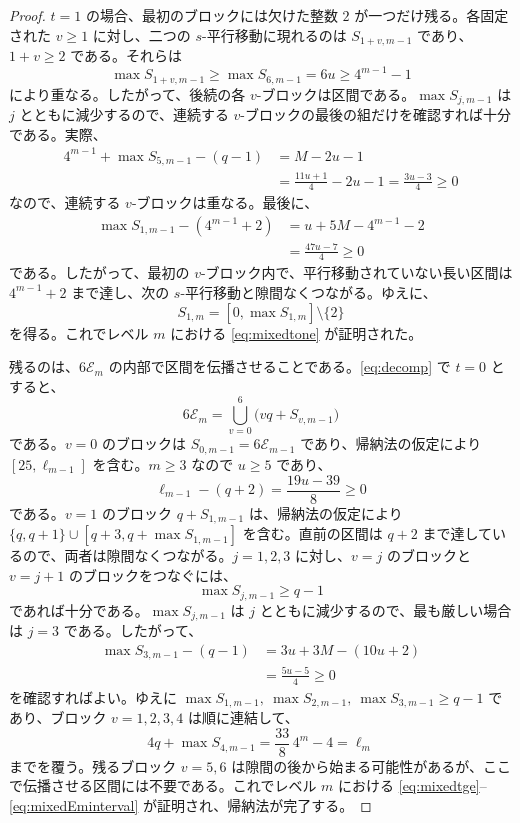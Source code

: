 \documentclass[12pt]{ltjsarticle}
\theoremstyle{plain}
\theoremstyle{definition}
\theoremstyle{plain}
\begin{document}
\begin{proof}
$t=1$ の場合、最初のブロックには欠けた整数 $2$ が一つだけ残る。各固定された $v\geq1$ に対し、二つの $s$-平行移動に現れるのは $S_{1+v,m-1}$ であり、$1+v\geq2$ である。それらは
\[
 \max S_{1+v,m-1}\geq\max S_{6,m-1}=6u\geq4^{m-1}-1
\]
により重なる。したがって、後続の各 $v$-ブロックは区間である。$\max S_{j,m-1}$ は $j$ とともに減少するので、連続する $v$-ブロックの最後の組だけを確認すれば十分である。実際、
\[
\begin{aligned}
 4^{m-1}+\max S_{5,m-1}-(q-1)
 &=M-2u-1\\
 &=\frac{11u+1}{4}-2u-1
  =\frac{3u-3}{4}\geq0
\end{aligned}
\]
なので、連続する $v$-ブロックは重なる。最後に、
\[
\begin{aligned}
 \max S_{1,m-1}-(4^{m-1}+2)
 &=u+5M-4^{m-1}-2\\
 &=\frac{47u-7}{4}\geq0
\end{aligned}
\]
である。したがって、最初の $v$-ブロック内で、平行移動されていない長い区間は $4^{m-1}+2$ まで達し、次の $s$-平行移動と隙間なくつながる。ゆえに、
\[
 S_{1,m}=[0,\max S_{1,m}]\setminus\{2\}
\]
を得る。これでレベル $m$ における \eqref{eq:mixedtone} が証明された。

残るのは、$6\mathcal E_m$ の内部で区間を伝播させることである。\eqref{eq:decomp} で $t=0$ とすると、
\[
 6\mathcal E_m=\bigcup_{v=0}^{6}\bigl(vq+S_{v,m-1}\bigr)
\]
である。$v=0$ のブロックは $S_{0,m-1}=6\mathcal E_{m-1}$ であり、帰納法の仮定により $[25,\ell_{m-1}]$ を含む。$m\geq3$ なので $u\geq5$ であり、
\[
 \ell_{m-1}-(q+2)=\frac{19u-39}{8}\geq0
\]
である。$v=1$ のブロック $q+S_{1,m-1}$ は、帰納法の仮定により $\{q,q+1\}\cup[q+3,q+\max S_{1,m-1}]$ を含む。直前の区間は $q+2$ まで達しているので、両者は隙間なくつながる。$j=1,2,3$ に対し、$v=j$ のブロックと $v=j+1$ のブロックをつなぐには、
\[
 \max S_{j,m-1}\geq q-1
\]
であれば十分である。$\max S_{j,m-1}$ は $j$ とともに減少するので、最も厳しい場合は $j=3$ である。したがって、
\[
\begin{aligned}
 \max S_{3,m-1}-(q-1)
 &=3u+3M-(10u+2)\\
 &=\frac{5u-5}{4}\geq0
\end{aligned}
\]
を確認すればよい。ゆえに $\max S_{1,m-1},\ \max S_{2,m-1},\ \max S_{3,m-1}\geq q-1$ であり、ブロック $v=1,2,3,4$ は順に連結して、
\[
 4q+\max S_{4,m-1}=\frac{33}{8}\,4^m-4=\ell_m
\]
までを覆う。残るブロック $v=5,6$ は隙間の後から始まる可能性があるが、ここで伝播させる区間には不要である。これでレベル $m$ における \eqref{eq:mixedtge}--\eqref{eq:mixedEminterval} が証明され、帰納法が完了する。
\end{proof}
\end{document}
